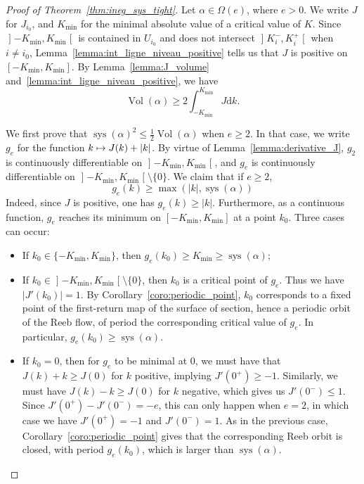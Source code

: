 \documentclass[AHL,Unicode,longabstracts]{cedram}
\DeclareMathOperator{\vol}{Vol}
\DeclareMathOperator{\sys}{sys}
\newcommand{\rmd}{\mathrm{d}}
\let\oldmapsto\mapsto
\renewcommand*{\mapsto}{\mathchoice{\longmapsto}{\oldmapsto}{\oldmapsto}{\oldmapsto}}
\begin{document}
\begin{proof}[{Proof of Theorem~\ref{thm:ineg_sys_tight}}]
Let $\alpha \in \Omega(e)$, where $e > 0$. We write $J$ for $J_{i_0}$, and $K_{\min}$ for the minimal absolute value of a critical value of $K$. Since $\mathopen{]}-K_{\min}, K_{\min}\mathclose{[}$ is contained in $U_{i_0}$ and does not intersect $\mathopen{]}K_i^-, K_i^+\mathclose{[}$ when $i \neq i_0$, Lemma~\ref{lemma:int_ligne_niveau_positive} tells us that $J$ is positive on $[-K_{\min}, K_{\min}]$. By Lemma~\ref{lemma:J_volume} and~\ref{lemma:int_ligne_niveau_positive}, we have
\begin{equation}\label{eq:volume_J_degre_1}
\vol(\alpha) \geq 2 \int_{-K_{\min}}^{K_{\min}} J \rmd k.
\end{equation}

We first prove that $\sys(\alpha)^2 \leq \frac{1}{2} \vol(\alpha)$ when $e \geq 2$. In that case, we write $g_e$ for the function $k \mapsto J(k) + |k|$. By virtue of Lemma~\ref{lemma:derivative_J}, $g_2$ is continuously differentiable on $\mathopen{]}-K_{\min}, K_{\min}\mathclose{[}$, and $g_e$ is continuously differentiable on $\mathopen{]}-K_{\min}, K_{\min}\mathclose{[}\setminus \{0\}$. We claim that if $e \geq 2$,
\begin{equation}\label{eq:lower_bound_g_e}
g_e(k) \geq \max\left(|k|, \sys(\alpha)\right)
\end{equation}
Indeed, since $J$ is positive, one has $g_e(k) \geq |k|$. Furthermore, as a continuous function, $g_e$ reaches its minimum on $[-K_{\min}, K_{\min}]$ at a point $k_0$. Three cases can occur:
\begin{itemize}
\item If $k_0 \in \{-K_{\min}, K_{\min}\}$, then $g_e(k_0) \geq K_{\min} \geq \sys(\alpha)$;
\item If $k_0 \in\mathopen{]}-K_{\min}, K_{\min}\mathclose{[}\setminus \{0\}$, then $k_0$ is a critical point of $g_e$. Thus we have $|J'(k_0)| = 1$. By Corollary~\ref{coro:periodic_point}, $k_0$ corresponds to a fixed point of the first-return map of the surface of section, hence a periodic orbit of the Reeb flow, of period the corresponding critical value of $g_e$. In particular, $g_e(k_0) \geq \sys(\alpha)$.
\item If $k_0 = 0$, then for $g_e$ to be minimal at 0, we must have that $J(k) + k \geq J(0)$ for $k$ positive, implying $J'(0^+) \geq -1$. Similarly, we must have $J(k) - k \geq J(0)$ for $k$ negative, which gives us $J'(0^-) \leq 1$. Since $J'(0^+)-J'(0^-) = -e$, this can only happen when $e = 2$, in which case we have $J'(0^+) = -1$ and $J'(0^-) = 1$. As in the previous case, Corollary~\ref{coro:periodic_point} gives that the corresponding Reeb orbit is closed, with period $g_e(k_0)$, which is larger than $\sys(\alpha)$.
\end{itemize}


\end{proof}
\end{document}
